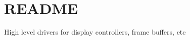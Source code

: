 \chapter{README}
\hypertarget{md_managed__components_2lvgl____lvgl_2src_2drivers_2README}{}\label{md_managed__components_2lvgl____lvgl_2src_2drivers_2README}
High level drivers for display controllers, frame buffers, etc 